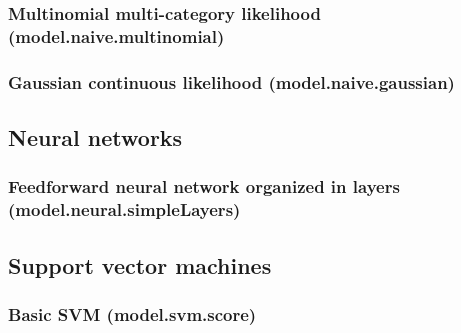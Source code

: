 \documentclass{article}
\theoremstyle{definition}
\begin{document}
\subsubsection{Multinomial multi-category likelihood (model.naive.multinomial)}

\subsubsection{Gaussian continuous likelihood (model.naive.gaussian)}

\subsection{Neural networks}

\subsubsection{Feedforward neural network organized in layers (model.neural.simpleLayers)}

\subsection{Support vector machines}

\subsubsection{Basic SVM (model.svm.score)}
\end{document}
